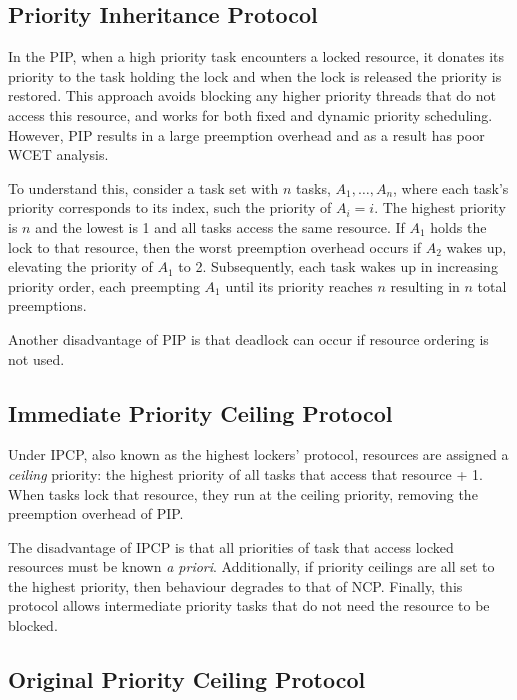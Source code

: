 \subsection{Priority Inheritance Protocol}
\label{sec:pip}

In the \gls{PIP}, when a high priority task encounters a locked resource, it donates its priority 
to the task holding the lock and when the lock is released the priority is restored. 
This approach avoids blocking any higher priority threads that do not access this resource, and
works for both fixed and dynamic priority scheduling.
However, \gls{PIP} results in a large preemption overhead and as a result has poor WCET analysis.

To understand this, consider a task set with $n$ tasks, $A_{1}, \ldots, A_{n}$, where each task's priority
corresponds to its index, such the priority of $A_{i} = i$. The highest priority is $n$ and the
lowest is 1 and all tasks access the same resource. If $A_{1}$ holds the lock to that resource, then
the worst preemption overhead occurs if $A_{2}$ wakes up, elevating the priority of $A_{1}$ to 2. Subsequently,
each task wakes up in increasing priority order, each preempting $A_{1}$ until its priority reaches
$n$ resulting in $n$ total preemptions. 

Another disadvantage of \gls{PIP} is that deadlock can occur if resource ordering is not used.


\subsection{Immediate Priority Ceiling Protocol}
\label{sec:hlp}
\label{sec:ipcp}

Under \gls{IPCP}, also known as the highest lockers' protocol, resources are assigned a
\emph{ceiling} priority: the highest priority of all tasks that access that resource + 1.  When tasks
lock that resource, they run at the ceiling priority, removing the preemption overhead
of \gls{PIP}.

The disadvantage of \gls{IPCP} is that all priorities of task that access locked resources must be known \emph{a
priori}.  Additionally, if priority ceilings are all set to the highest priority, then behaviour
degrades to that of \gls{NCP}. Finally, this protocol allows intermediate priority tasks that do not need
the resource to be blocked. 

\subsection{Original Priority Ceiling Protocol}

